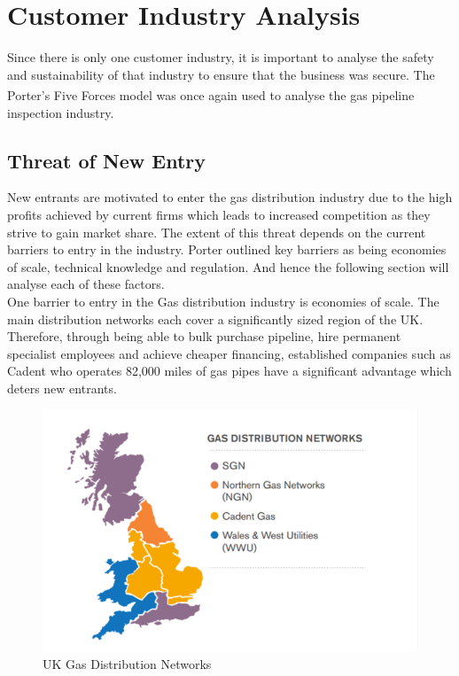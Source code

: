 \documentclass[11pt]{article}		%
\begin{document}
	\section{Customer Industry Analysis}
		Since there is only one customer industry, it is important to analyse the safety and sustainability of that industry to ensure that the business was secure.
		The Porter's Five Forces model\textsuperscript{\cite{porter2008five}} was once again used to analyse the gas pipeline inspection industry.
			
		\subsection[Threat of New Entry]{Threat of New Entry}
				New entrants are motivated to enter the gas distribution industry due to the high profits achieved by current firms which leads to increased competition as they strive to gain market share. The extent of this threat depends on the current barriers to entry in the industry. Porter outlined key barriers as being economies of scale, technical knowledge and regulation. And hence the following section will analyse each of these factors. \\
				
				One barrier to entry in the Gas distribution industry is economies of scale. The main distribution networks each cover a significantly sized region of the UK. Therefore, through being able to bulk purchase pipeline, hire permanent specialist employees and achieve cheaper financing, established companies such as Cadent who operates 82,000 miles of gas pipes have a significant advantage which deters new entrants. \\
					\begin{figure}[h]
			    \centering
		    	\includegraphics[scale=0.8]{distribution.pdf}
			    \caption{UK Gas Distribution Networks} %
		    	\label{distrit}
	        	\end{figure}
				
\end{document}

